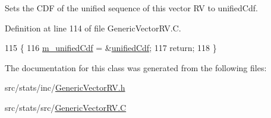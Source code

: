 Sets the C\-D\-F of the unified sequence of {\ttfamily this} vector R\-V to {\ttfamily unified\-Cdf}. 



Definition at line 114 of file Generic\-Vector\-R\-V.\-C.


\begin{DoxyCode}
115 \{
116   \hyperlink{class_q_u_e_s_o_1_1_base_vector_r_v_a31a1d44bbb6a7c030ca31a9577904252}{m\_unifiedCdf} = &\hyperlink{class_q_u_e_s_o_1_1_base_vector_r_v_a045a14e1ee948ac3162199a06606ce80}{unifiedCdf};
117   \textcolor{keywordflow}{return};
118 \}
\end{DoxyCode}


The documentation for this class was generated from the following files\-:\begin{DoxyCompactItemize}
\item 
src/stats/inc/\hyperlink{_generic_vector_r_v_8h}{Generic\-Vector\-R\-V.\-h}\item 
src/stats/src/\hyperlink{_generic_vector_r_v_8_c}{Generic\-Vector\-R\-V.\-C}\end{DoxyCompactItemize}
